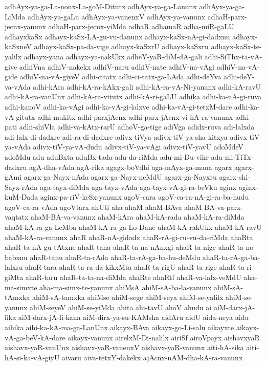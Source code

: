 {adhAyx-ya-ga-La-nonx-La-goM-Ditutx
adhAyx-ya-ga-Lanunx
adhAyx-ya-ga-LiMda
adhAyx-ya-gaLu
adhAyx-ya-vanenxV
adhAyx-ya-vanunx
adhaH-parx-jecnx-yanunx
adhaH-parx-jecnx-yiMda
adhaR
adhamaR
adha-miR-gaLU
adhayxkaSx
adhayx-kaSx-LA-gu-vu-danunx
adhayx-kaSx-nA-gi-dadxnu
adhayx-kaSxneV
adhayx-kaSx-pa-da-vige
adhayx-kaSxrU
adhayx-kaSxru
adhayx-kaSx-te-yalilx
adhayx-yana
adhayx-ya-nakUkx
adheY-yaR-diM-dA-gali
adhi-SiThx-ta-vA-give
adhiVna
adhiV-nakekx
adhiV-naru
adhiV-nate
adhiV-na-vAgi
adhiV-na-vA-gide
adhiV-na-vA-giyeV
adhi-citatx
adhi-ci-tatx-ga-LAda
adhi-deYva
adhi-deY-va-vAda
adhi-kAra
adhi-kA-ra-kAkx-gali
adhi-kA-ra-vA-Ni-yanunx
adhi-kA-ravU
adhi-kA-ra-vanUnx
adhi-kA-ra-vitutx
adhi-kA-ri-gaLU
adhika
adhi-ka-nA-gi-ruva
adhi-kanoV
adhi-ka-vAgi
adhi-ka-vA-gi-lalxve
adhi-ka-vA-gi-tetxM-dare
adhi-ka-vA-gitutx
adhi-mukitx
adhi-parxjAcnx
adhi-parx-jAcnx-vi-hA-ra-vanunx
adhi-pati
adhi-shiVla
adhi-va-kAtx-rarU
adhoV-ga-tige
adiVga
adidx-ruva
adi-lalxda
adi-lalx-di-dadxre
adi-ra-di-dadxre
adivx-tiVya
adivx-tiV-ya-sha-kitxya
adivx-tiV-ya-vAda
adivx-tiV-ya-vA-dudu
adivx-tiV-ya-vAgi
adivx-tiV-yavU
adoMdeV
adoMdu
adu
aduBxta
aduBx-tada
adu-da-riMda
adu-mi-Du-vike
adu-mi-TiTx-dadxru
agA-dha-vAda
agA-rika
agagx-boVdhi
aga-mAyx-ga-mana
agarx
agarx-gAmi
agarx-ga-Nayx-nAda
agarx-ga-Nayx-neMdU
agarx-ga-Nayxru
agarx-shi-Sayx-rAda
aga-tayx-diMda
aga-tayx-vAda
aga-tayx-vA-gi-ra-beVku
aginx
aginx-kuM-Dada
aginx-pa-riV-keSx-yanunx
agoV-cara
agoV-ca-ra-nA-gi-ra-ba-hudu
agoV-ca-ra-vAda
agoVtarx
ahUti
aha
ahaM
ahaM-BAva
ahaM-BA-va-parx-vaqtatx
ahaM-BA-va-vanunx
ahaM-kAra
ahaM-kA-rada
ahaM-kA-ra-diMda
ahaM-kA-ra-ga-LeMba
ahaM-kA-ra-ga-Lo-Dane
ahaM-kA-rakUkx
ahaM-kA-ravU
ahaM-kA-ra-vanunx
ahaR
ahaR-nA-gidadx
ahaR-rA-gi-ru-vu-da-riMda
ahaRta
ahaR-ta-nA-gu-tAtxne
ahaR-tana
ahaR-ta-na-nAnxgi
ahaR-ta-nige
ahaR-ta-no-babxnu
ahaR-tanu
ahaR-ta-rAda
ahaR-ta-rA-ga-ba-hu-deMdu
ahaR-ta-rA-ga-ba-lalxru
ahaR-tara
ahaR-ta-ra-da-kikxMta
ahaR-ta-rigU
ahaR-ta-rige
ahaR-ta-ri-giMta
ahaR-taru
ahaR-ta-ta-na-diMda
ahaRte
ahaRtf
ahaR-va-lalx-veMdU
aha-ma-simxte
aha-ma-simx-te-yanunx
ahiMsA
ahiM-sA-ba-la-vanunx
ahiM-sA-tAmxka
ahiM-sA-tamxka
ahiMse
ahiM-sege
ahiM-seya
ahiM-se-yalilx
ahiM-se-yanunx
ahiM-seyeV
ahiM-se-yiMda
ahita
ahi-tavU
ahoV
ahudu
ai
aiM-darx-jA-lika
aiM-darx-jA-li-kana
aiM-dirx-ya-su-KAMsha
aidAru
aidU
aida-neya
aidu
aihika
aihi-ka-kA-ma-ga-LanUnx
aikayx-BAva
aikayx-go-Li-salu
aikayxte
aikayx-vA-ga-beV-kA-dare
aikayx-vanunx
airelxM-Di-nalilx
airiSf
airoVpayx
aishavxyaR
aishavx-yaR-vanUnx
aishavx-yaR-vanenxV
aishavx-yaR-vanunx
aiti-hA-sika
aiti-hA-si-ka-vA-giyU
aivaru
aiva-tetxY-dakekx
ajAcnx-nAM-dha-kA-ra-vanunx
}
